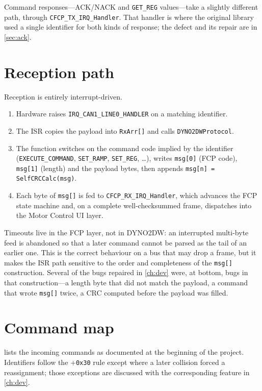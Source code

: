 Command responses---ACK/NACK and \texttt{GET\_REG} values---take a
slightly different path, through \texttt{CFCP\_TX\_IRQ\_Handler}. That
handler is where the original library used a single identifier for both
kinds of response; the defect and its repair are in \cref{sec:ack}.

\section{Reception path}
\label{sec:rx}

Reception is entirely interrupt-driven.

\begin{enumerate}[leftmargin=1.6em]
  \item Hardware raises \texttt{IRQ\_CAN1\_LINE0\_HANDLER} on a matching
        identifier.
  \item The ISR copies the payload into \texttt{RxArr[]} and calls
        \texttt{DYNO2DWProtocol}.
  \item The function switches on the command code implied by the
        identifier (\texttt{EXECUTE\_COMMAND}, \texttt{SET\_RAMP},
        \texttt{SET\_REG}, \ldots), writes \texttt{msg[0]} (FCP code),
        \texttt{msg[1]} (length) and the payload bytes, then appends
        \texttt{msg[n] = SelfCRCCalc(msg)}.
  \item Each byte of \texttt{msg[]} is fed to
        \texttt{CFCP\_RX\_IRQ\_Handler}, which advances the FCP state
        machine and, on a complete well-checksummed frame, dispatches into
        the Motor Control UI layer.
\end{enumerate}

Timeouts live in the FCP layer, not in DYNO2DW: an interrupted multi-byte
feed is abandoned so that a later command cannot be parsed as the tail of
an earlier one. This is the correct behaviour on a bus that may drop a
frame, but it makes the ISR path sensitive to the order and completeness
of the \texttt{msg[]} construction. Several of the bugs repaired in
\cref{ch:dev} were, at bottom, bugs in that construction---a length byte
that did not match the payload, a command that wrote \texttt{msg[]} twice,
a CRC computed before the payload was filled.

\section{Command map}
\label{sec:cmd-map}

 lists the incoming commands as documented at the
beginning of the project. Identifiers follow the $+$\texttt{0x30} rule
except where a later collision forced a reassignment; those exceptions are
discussed with the corresponding feature in \cref{ch:dev}.

